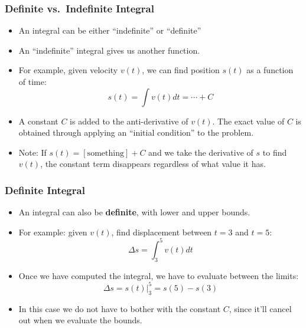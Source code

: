 \documentclass[12pt,compress,aspectratio=169]{beamer}
\begin{document}
\begin{frame}
  \frametitle{Definite vs.\ Indefinite Integral}
  \begin{itemize}
  \item An integral can be either ``indefinite'' or ``definite''
  \item An ``indefinite'' integral gives us another function.
  \item For example, given velocity $v(t)$, we can find position $s(t)$
    as a function of time:
    \begin{displaymath}
      s(t)=\int v(t) dt=\cdots + C
    \end{displaymath}
  \item A constant $C$ is added to the anti-derivative of $v(t)$. The exact
    value of $C$ is obtained through applying an ``initial condition'' to the
    problem.
  \item Note: If $s(t)=\mathrm{[something]}+C$ and we take the
    derivative of $s$ to find $v(t)$, the constant term disappears regardless
    of what value it has.
  \end{itemize}
\end{frame}

\begin{frame}
  \frametitle{Definite Integral}
  \begin{itemize}
  \item An integral can also be \textbf{definite},  with lower and upper
    bounds.
  \item For example: given $v(t)$, find displacement between $t=3$ and
    $t=5$:
    \begin{displaymath}
      \Delta s=\int_3^5 v(t)dt
    \end{displaymath}
  \item Once we have computed the integral, we have to evaluate between the
    limits:
    \begin{displaymath}
      \Delta s = s(t)\Big|^5_3=s(5)-s(3)
    \end{displaymath}
  \item In this case we do not have to bother with the constant $C$, since it'll
    cancel out when we evaluate the bounds.
  \end{itemize}
\end{frame}
\end{document}
